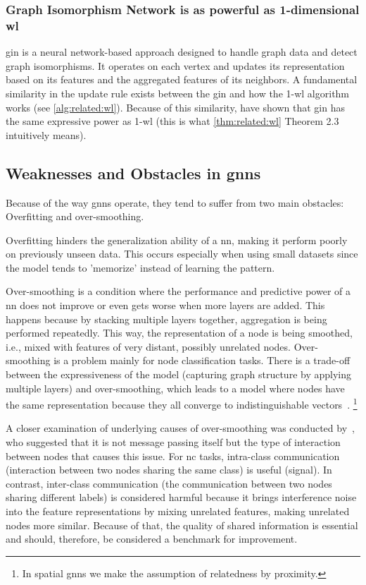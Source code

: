 \subsubsection{Graph Isomorphism Network is as powerful as 1-dimensional \acs*{wl}}
\Ac{gin} is a neural network-based approach designed to handle graph data and detect graph isomorphisms.
It operates on each vertex and updates its representation based on its features and the aggregated features of its neighbors.
A fundamental similarity in the update rule exists between the \ac{gin} and how the 1-\ac{wl} algorithm works (see \cref{alg:related:wl}). Because of this similarity, \citet{Xu2019} have shown that \ac{gin} has the same expressive power as 1-\ac{wl} (this is what \cref{thm:related:wl} Theorem 2.3 intuitively means).

\subsection{Weaknesses and Obstacles in \acsp*{gnn}}
\label{sec:related:pred:typical}
Because of the way \acp{gnn} operate, they tend to suffer from two main obstacles:
Overfitting and over-smoothing.

Overfitting hinders the generalization ability of a \acf{nn}, making it perform poorly on previously unseen data.
This occurs especially when using small datasets since the model tends to 'memorize' instead of learning the pattern.

Over-smoothing is a condition where the performance and predictive power of a \ac{nn} does not improve or even gets worse when more layers are added.
This happens because by stacking multiple layers together, aggregation is being performed repeatedly.
This way, the representation of a node is being smoothed, i.e., mixed with features of very distant, possibly unrelated nodes.
Over-smoothing is a problem mainly for node classification tasks. There is a trade-off between the expressiveness of the model (capturing graph structure by applying multiple layers) and over-smoothing, which leads to a model where nodes have the same representation because they all converge to indistinguishable vectors~\cite{Zhou2020,Hasanzadeh2020}.%
\footnote{In spatial \acp{gnn} we make the assumption of relatedness by proximity.}

A closer examination of underlying causes of over-smoothing was conducted by~\citet {Chen2020}, who suggested that it is not message passing itself but the type of interaction between nodes that causes this issue.
For \acf{nc} tasks, intra-class communication (interaction between two nodes sharing the same class) is useful (signal).
In contrast, inter-class communication (the communication between two nodes sharing different labels) is considered harmful because it brings interference noise into the feature representations by mixing unrelated features, making unrelated nodes more similar.
Because of that, the quality of shared information is essential and should, therefore, be considered a benchmark for improvement.

